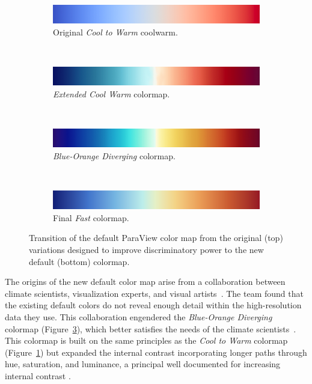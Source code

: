 \documentclass{IEEEcsmag}
\newcommand*{\colormap}[1]{\textsl{#1}\xspace}
\newcommand*{\coolwarm}{\colormap{Cool to Warm}}
\newcommand*{\blueorange}{\colormap{Blue-Orange Diverging}}
\newcommand*{\fast}{\colormap{Fast}}
\newcommand*{\extendedcoolwarm}{\colormap{Extended Cool Warm}}
\begin{document}
\begin{figure}[ht]
  \begin{subfigure}{\linewidth}
    \includegraphics[width=\linewidth]{map-cool-to-warm}
    \vspace{-1.4\baselineskip}
    \caption{Original \coolwarm coolwarm.}
    \label{fig:design:coolwarm}
  \end{subfigure}\\[4pt]
  \begin{subfigure}{\linewidth}
    \includegraphics[width=\linewidth]{CW_extended}
    \vspace{-1.4\baselineskip}
    \caption{\extendedcoolwarm colormap.}
    \label{fig:design:cw est}
  \end{subfigure}\\[4pt]
  \begin{subfigure}{\linewidth}
    \includegraphics[width=\linewidth]{map-blue-orange-diverging}
    \vspace{-1.4\baselineskip}
    \caption{\blueorange colormap.}
    \label{fig:design:blueorange}
  \end{subfigure}\\[4pt]
  \begin{subfigure}{\linewidth}
    \includegraphics[width=\linewidth]{map-fast}
    \vspace{-1.4\baselineskip}
    \caption{Final \fast colormap.}
    \label{fig:design:fast}
  \end{subfigure}
  \caption{
    Transition of the default ParaView color map from the original (top) variations designed to improve discriminatory power to the new default (bottom) colormap.
  }
  \label{fig:designs}
\end{figure}


The origins of the new default color map arise from a collaboration between climate scientists, visualization experts, and visual artists~\cite{Samsel2015}.
The team found that the existing default colors do not reveal enough detail within the high-resolution data they use.
This collaboration engendered the \blueorange colormap (Figure~\ref{fig:design:blueorange}), which better satisfies the needs of the climate scientists~\cite{Samsel2015:SC}.
This colormap is built on the same principles as the \coolwarm colormap (Figure~\ref{fig:design:coolwarm}) but expanded the internal contrast incorporating longer paths through hue, saturation, and luminance, a principal well documented for increasing internal contrast \cite{Ware2023}.
\end{document}
